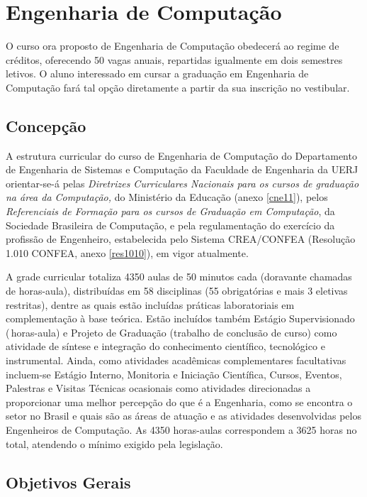 
\chapter{Engenharia de Computação}
O curso ora proposto de Engenharia de Computação obedecerá ao regime de créditos, oferecendo 50 vagas anuais, repartidas igualmente em dois semestres letivos. O aluno interessado em cursar a graduação em Engenharia de Computação fará tal opção diretamente a partir da sua inscrição no vestibular.

\section{Concepção}

A estrutura curricular do curso de Engenharia de Computação do Departamento de Engenharia de Sistemas e Computação da Faculdade de Engenharia da UERJ orientar-se-á pelas \textit{Diretrizes Curriculares Nacionais para os cursos de graduação na área da Computação,} do Ministério da Educação (anexo \ref{cne11}), pelos \textit{Referenciais de Formação para os cursos de Graduação em Computação}, da Sociedade Brasileira de Computação, e pela regulamentação do exercício da profissão de Engenheiro, estabelecida pelo Sistema CREA/CONFEA (Resolução 1.010 CONFEA, anexo \ref{res1010}), em vigor atualmente.

A grade curricular totaliza 4350 aulas de 50 minutos cada (doravante chamadas de horas-aula), distribuídas em 58 disciplinas (55 obrigatórias e mais 3 eletivas restritas), dentre as quais estão incluídas práticas laboratoriais em complementação à base teórica. Estão incluídos também Estágio Supervisionado (\EstSupCH\,horas-aula) e Projeto de Graduação (trabalho de conclusão de curso) como atividade de síntese e integração do conhecimento científico, tecnológico e instrumental. Ainda, como atividades acadêmicas complementares facultativas incluem-se Estágio Interno, Monitoria e Iniciação Científica, Cursos, Eventos, Palestras e Visitas Técnicas ocasionais como atividades direcionadas a proporcionar uma melhor percepção do que é a Engenharia, como se encontra o setor no Brasil e quais são as áreas de atuação e as atividades desenvolvidas pelos Engenheiros de Computação. As 4350 horas-aulas correspondem a 3625 horas no total, atendendo o mínimo exigido pela legislação.

\section{Objetivos Gerais}

